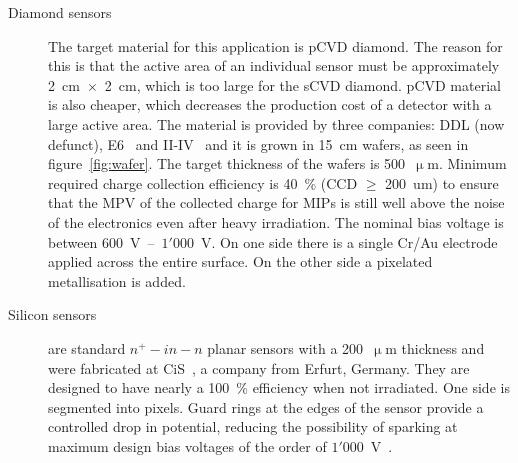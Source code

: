 \begin{description}
\item[Diamond sensors] The target material for this application is pCVD diamond. The reason for this is that the active area of an individual sensor must be approximately 2~cm~$\times$~2~cm, which is too large for the sCVD diamond. pCVD material is also cheaper, which decreases the production cost of a detector with a large active area. The material is provided by three companies: DDL (now defunct), E6~\cite{E6:00000} and II-IV~\cite{II-IV:00000} and it is grown in 15~cm wafers, as seen in figure~\ref{fig:wafer}. The target thickness of the wafers is 500~$\upmu$m. Minimum required charge collection efficiency is 40~\% (CCD $\geq$ 200~um) to ensure that the MPV of the collected charge for MIPs is still well above the noise of the electronics even after heavy irradiation. The nominal bias voltage is between 600~V~--~$1'000$~V. On one side there is a single Cr/Au electrode applied across the entire surface. On the other side a pixelated metallisation is added. 
\item[Silicon sensors] are standard $n^+ - in - n$ planar sensors with a 200~$\upmu$m thickness and were fabricated at CiS~\cite{CIS:00000}, a company from Erfurt, Germany. They are designed to have nearly a 100~\% efficiency when not irradiated. 
One side is segmented into pixels. Guard rings at the edges of the sensor provide a controlled drop in potential, reducing the possibility of sparking at maximum design bias voltages of the order of $1'000$~V~\cite{ATLIBL:00001,Dopke:1560823}.
\end{description}



